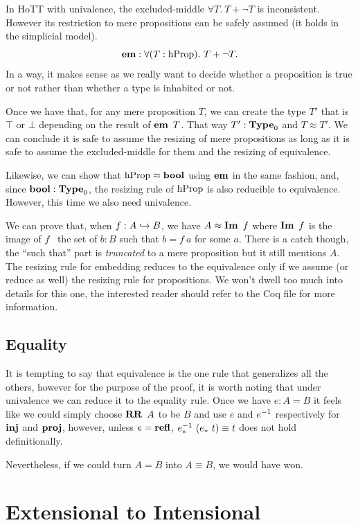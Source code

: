 \documentclass[11pt]{article}
\theoremstyle{plain}
\theoremstyle{remark}
\begin{document}
In HoTT with univalence, the excluded-middle $\forall T.\ T + \neg T$ is
inconsistent. However its restriction to mere propositions can be safely
assumed (it holds in the simplicial model).
\[\operatorname{\mathbf{em}} : \forall (T:\operatorname{hProp}).\ T + \neg T.\]
In a way, it makes sense as we really want to decide whether a proposition is
true or not rather than whether a type is inhabited or not.

Once we have that, for any mere proposition $T$, we can create the type $T'$
that is $\top$ or $\bot$ depending on the result of $\operatorname{\mathbf{em}}\ T$.
That way $T' : \operatorname{\mathbf{Type}}_0$ and $T \approx T'$.
We can conclude it is safe to assume the resizing of mere propositions as long
as it is safe to assume the excluded-middle for them and the resizing of
equivalence.

Likewise, we can show that $\operatorname{hProp} \approx \operatorname{\mathbf{bool}}$ using $\operatorname{\mathbf{em}}$ in the same
fashion, and, since $\operatorname{\mathbf{bool}} : \operatorname{\mathbf{Type}}_0$, the resizing rule of $\operatorname{hProp}$ is also
reducible to equivalence. However, this time we also need univalence.

We can prove that, when $f : A \hookrightarrow B$, we have $A \approx \operatorname{\mathbf{Im}}\ f$
where $\operatorname{\mathbf{Im}}\ f$ is the image of $f$ \ie\ the set of $b : B$ such that $b = f\ a$
for some $a$. There is a catch though, the ``such that'' part is
\emph{truncated} to a mere proposition but it still mentions $A$. The resizing
rule for embedding reduces to the equivalence only if we assume
(or reduce as well) the resizing rule for propositions.
We won't dwell too much into details for this one, the interested reader should
refer to the Coq file for more information.

\subsection{Equality}
It is tempting to say that equivalence is the one rule that generalizes all the
others, however for the purpose of the proof, it is worth noting that under
univalence we can reduce it to the equality rule.
Once we have $e : A = B$ it feels like we could simply choose $\RR\ A$ to be
$B$ and use $e$ and $e^{-1}$ respectively for $\operatorname{\mathbf{inj}}$ and $\operatorname{\mathbf{proj}}$,
however, unless $e = \operatorname{\mathbf{refl}}$, $e^{-1}_*\ (e_*\ t) \equiv t$ does not hold
definitionally.

Nevertheless, if we could turn $A = B$ into $A \equiv B$, we would have won.

\section{Extensional to Intensional}
\end{document}

